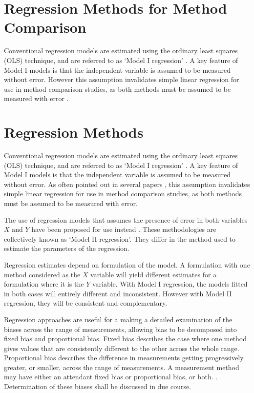 \documentclass[12pt, a4paper]{report}
\theoremstyle{plain}
\theoremstyle{definition}
\theoremstyle{remark}
\begin{document}
	\section{Regression Methods for Method Comparison}
	Conventional regression models are estimated using the ordinary
	least squares (OLS) technique, and are referred to as `Model I
	regression' \citep{CornCoch,ludbrook97}. A key feature of Model I
	models is that the independent variable is assumed to be measured
	without error. However this assumption invalidates simple linear
	regression for use in method comparison studies, as both methods
	must be assumed to be measured with error \citep{BA83,ludbrook97}.
	

	
	
		\section{Regression Methods}
		Conventional regression models are estimated using the ordinary
		least squares (OLS) technique, and are referred to as `Model I
		regression' \citep{CornCoch,ludbrook97}. A key feature of Model I
		models is that the independent variable is assumed to be measured
		without error. As often pointed out in several papers
		\citep{BA83,ludbrook97}, this assumption invalidates simple linear
		regression for use in method comparison studies, as both methods
		must be assumed to be measured with error.
		
		The use of regression models that assumes the presence of error in
		both variables $X$ and $Y$ have been proposed for use instead
		\citep{CornCoch,ludbrook97}. These methodologies are collectively
		known as `Model II regression'. They differ in the method used to
		estimate the parameters of the regression.
		
		Regression estimates depend on formulation of the model. A
		formulation with one method considered as the $X$ variable will
		yield different estimates for a formulation where it is the $Y$
		variable. With Model I regression, the models fitted in both cases
		will entirely different and inconsistent. However with Model II
		regression, they will be consistent and complementary.
		
		Regression approaches are useful for a making a detailed examination of the biases across the range of measurements, allowing bias to be decomposed into fixed bias and proportional bias.
		Fixed bias describes the case where one method gives values that are consistently different
		to the other across the whole range. Proportional
		bias describes the difference in measurements getting progressively greater, or smaller, across the range of measurements. A measurement method may have either an attendant fixed bias or proportional bias, or both. \citep{ludbrook}. Determination of these biases shall be discussed in due course.
		
\end{document}
